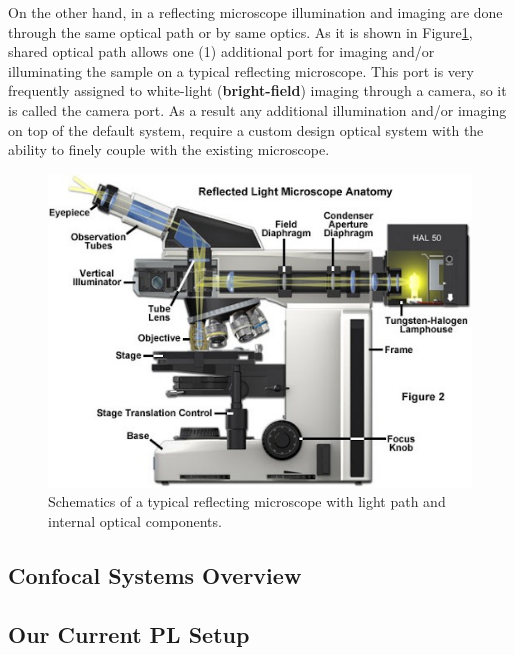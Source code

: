 On the other hand, in a reflecting microscope illumination and imaging are done through the
same optical path or by same optics. As it is shown in Figure\ref{fig:ReflectingMicroscope},
shared optical path allows one (1) additional port for imaging and/or illuminating the sample
on a typical reflecting microscope. This port is very frequently assigned to white-light
(\textbf{bright-field}) imaging through a camera, so it is called the camera port. As a result
any additional illumination and/or imaging on top of the default system, require a custom
design optical system with the ability to finely couple with the existing microscope.

\begin{figure}[H]
	\centering
	\includegraphics[angle=0,origin=c,width = 1.0\linewidth]{Section_Microscope/Figures/ReflectingMicroscope.jpeg}
	\caption{Schematics of a typical reflecting microscope with light path and internal 
		optical components.}
	\label{fig:ReflectingMicroscope}
\end{figure}

\subsection{Confocal Systems Overview}

\subsection{Our Current PL Setup}
